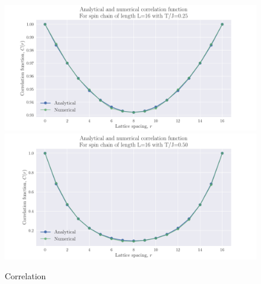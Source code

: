\documentclass[reprint,english,notitlepage,aps,nobalancelastpage,nofootinbib]{revtex4-1}
\begin{document}
\begin{figure}[h!]
	\centering
	\includegraphics[width=0.7\linewidth]{correlation1D_025.pdf}
	\includegraphics[width=0.7\linewidth]{correlation1D_05.pdf}
	\caption{Correlation}
	\label{fig:correlation}
\end{figure}
\end{document}
